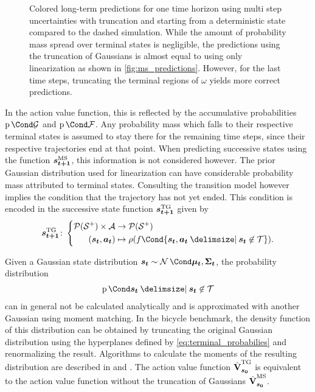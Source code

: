 \begin{figure}[t]
    \centering
    \caption[Long-term predictions using multi step uncertainties with truncation]{
        Colored long-term predictions for one time horizon using multi step uncertainties with truncation and starting from a deterministic state compared to the dashed simulation.
        While the amount of probability mass spread over terminal states is negligible, the predictions using the truncation of Gaussians is almost equal to using only linearization as shown in \cref{fig:ms_predictions}.
        However, for the last time steps, truncating the terminal regions of $\omega$ yields more correct predictions.
    }
    \label{fig:ms_truncation_predictions}
\end{figure}
In the action value function, this is reflected by the accumulative probabilities $\Prob{\PGoal}$ and $\Prob{\PFallen}$.
Any probability mass which falls to their respective terminal states is assumed to stay there for the remaining time steps, since their respective trajectories end at that point.
When predicting successive states using the function $\bm{s_{t+1}}^{\text{MS}}$, this information is not considered however.
The prior Gaussian distribution used for linearization can have considerable probability mass attributed to terminal states.
Consulting the transition model however implies the condition that the trajectory has not yet ended.
This condition is encoded in the successive state function $\bm{s_{t+1}}^{\text{TG}}$ given by
\begin{align}
    \tg{\mat{s_{t+1}}} \colon \left\{
        \begin{aligned}
            \Dists(\Es^+) \times \Ah &\to \Dists(\Es^+) \\
            (\rv{s_t}, \mat{a_t}) &\mapsto \squeeze(f\Cond{\rv{s_t}, \mat{a_t} \given \rv{s_t} \not\in \Tee}).
    \end{aligned}
    \right.
\end{align}

Given a Gaussian state distribution $\rv{s_t} \sim \Gaussian{\mat{\mu_t}, \mat{\Sigma_t}}$, the probability distribution
\begin{align}
    \Prob{\rv{s_t} \given \rv{s_t} \not\in\Tee}
\end{align}
can in general not be calculated analytically and is approximated with another Gaussian using moment matching.
In the bicycle benchmark, the density function of this distribution can be obtained by truncating the original Gaussian distribution using the hyperplanes defined by \cref{eq:terminal_probabilies} and renormalizing the result.
Algorithms to calculate the moments of the resulting distribution are described in \cite{herbrich_gaussian_2005} and \cite{toussaint_technical_2009}.
The action value function $\operatorname{\hat{\operatorname{\mathbf{V}}}}^{\text{TG}}_{\bm{s_0}}$ is equivalent to the action value function without the truncation of Gaussians $\operatorname{\hat{\operatorname{\mathbf{V}}}}^{\text{MS}}_{\bm{s_0}}$.

